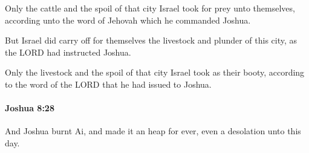 			\begin{versebox}
					\item[BHS] 
					\item[ASV] Only the cattle and the spoil of that city Israel took for prey unto themselves, according unto the word of Jehovah which he commanded Joshua.
					\item[NIV] But Israel did carry off for themselves the livestock and plunder of this city, as the LORD had instructed Joshua.
					\item[NRSV] Only the livestock and the spoil of that city Israel took as their booty, according to the word of the LORD that he had issued to Joshua.
			\end{versebox}

		\paragraph{Joshua 8:28} %
			\label{JOSHUA-8-28}

			And Joshua burnt Ai, and made it an heap for ever, even a desolation unto this day.

